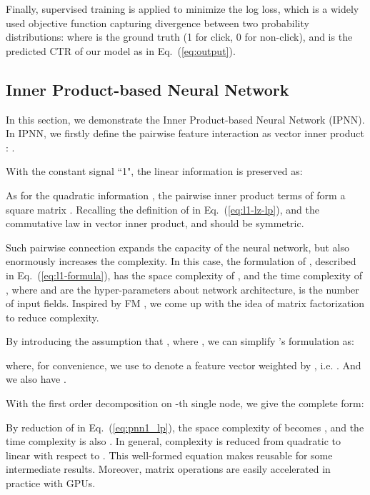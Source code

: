 \documentclass[conference]{IEEEtran}
\begin{document}
Finally, supervised training is applied to minimize the log loss, which is a widely used objective function capturing divergence between two probability distributions: 
where  is the ground truth (1 for click, 0 for non-click), and  is the predicted CTR of our model as in Eq.~(\ref{eq:output}).

\subsection{Inner Product-based Neural Network}\label{sec:pnn-i}
In this section, we demonstrate the Inner Product-based Neural Network (IPNN). In IPNN, we firstly define the pairwise feature interaction as vector inner product
: .






With the constant signal ``1", the linear information  is preserved as:


As for the quadratic information , the pairwise inner product terms of  form a square matrix .
Recalling the definition of  in Eq.~(\ref{eq:l1-lz-lp}),  and the commutative law in vector inner product,  and  should be symmetric.

Such pairwise connection expands the capacity of the neural network, but also enormously increases the complexity.
In this case, the formulation of , described in Eq.~(\ref{eq:l1-formula}), has the space complexity of , and the time complexity of , where  and  are the hyper-parameters about network architecture,  is the number of input fields.
Inspired by FM \cite{rendle2010factorization}, we come up with the idea of matrix factorization to reduce complexity.





By introducing the assumption that , where , we can simplify 's formulation as:

where, for convenience, we use  to denote a feature vector  weighted by , i.e. . And we also have .


With the first order decomposition on -th single node, we give the  complete form:






By reduction of  in Eq.~(\ref{eq:pnn1_lp}), the space complexity of  becomes , and the time complexity is also . In general,  complexity is reduced from quadratic to linear with respect to . This well-formed equation makes reusable for some intermediate results. Moreover, matrix operations are easily accelerated in practice with GPUs.
\end{document}
